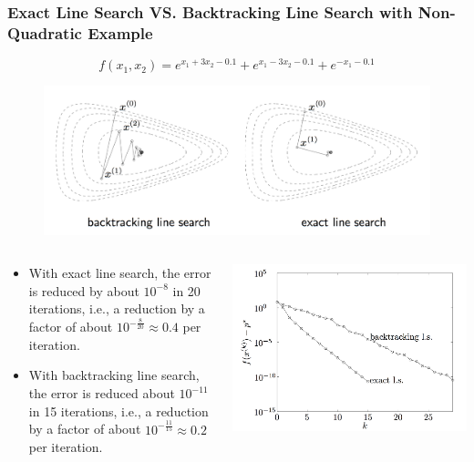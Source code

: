\begin{frame}
  \frametitle{Exact Line Search VS.  Backtracking Line Search with
    Non-Quadratic Example}
$$f(x_1, x_2) = e^{x_1+3x_2-0.1} + e^{x_1-3x_2-0.1} + e^{-x_1-0.1}$$

\begin{figure}
\centering
\includegraphics[scale=0.25]{pics/btes.png}
\end{figure}



\begin{columns}
  \begin{column}{0.6\textwidth}
{\tiny
    \begin{itemize}
    \item With exact line search, the error is reduced by about $10^{-8}$
      in 20 iterations, i.e., a reduction by a factor of
 about $10^{-\frac{8}{20}} \approx 0.4$ per iteration.
\item With backtracking line search, the error is reduced
about $10^{-11}$ in 15 iterations, i.e., a reduction by a factor of
 about $10^{-\frac{11}{15}} \approx 0.2$ per iteration.
    \end{itemize}
}
  \end{column}

\begin{column}{0.5\textwidth}
\includegraphics[scale = 0.12]{pics/els.png}

\end{column}

\end{columns}
\end{frame}


